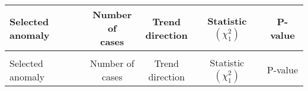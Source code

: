 \documentclass[
]{krantz}
\begin{document}
\begingroup\fontsize{8}{10}\selectfont

\begin{longtable}[t]{>{\raggedright\arraybackslash}p{4cm}cccc}
\toprule
Selected anomaly & \makecell[c]{Number of\\ cases} & \makecell[c]{Trend \\ direction} & \makecell[c]{Statistic \\ $\left(\chi^{2}_{1}\right)$} & P-value\\
\midrule
\endfirsthead
\multicolumn{5}{@{}l}{\textit{(continued)}}\\
\toprule
Selected anomaly & \makecell[c]{Number of\\ cases} & \makecell[c]{Trend \\ direction} & \makecell[c]{Statistic \\ $\left(\chi^{2}_{1}\right)$} & P-value\\
\midrule
\endhead


\end{longtable}
\end{document}
